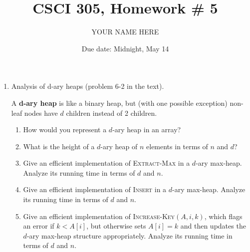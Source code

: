 \documentclass{article}
\title{CSCI 305, Homework \# 5}
\author{YOUR NAME HERE}
\date{Due date:  Midnight, May 14}
\begin{document}
  
  \maketitle
  
  \begin{enumerate}
  \item Analysis of d-ary heaps (problem 6-2 in the text).
  
   A \textbf{d-ary heap} is like a binary heap, but (with one possible
   exception) non-leaf nodes have $d$ children instead of 2 children.
   \begin{enumerate}
   \item How would you represent a $d$-ary heap in an array?
     \item What is the height of a $d$-ary heap of $n$ elements in terms
       of $n$ and $d$?
     \item Give an efficient implementation of \textsc{Extract-Max} in
         a $d$-ary max-heap.  Analyze its running time in terms of $d$
         and $n$.
       \item Give an efficient implementation of \textsc{Insert} in
         a $d$-ary max-heap.  Analyze its running time in terms of $d$
         and $n$.
       \item Give an efficient implementation of
         \textsc{Increase-Key}$(A,i,k)$,
         which flags an error if $k < A[i]$, but otherwise sets $A[i] =
         k$ and then updates the $d$-ary max-heap structure
         appropriately.    Analyze its running time in terms of $d$
         and $n$.
   \end{enumerate}
  \end{enumerate}
  
  
\end{document}
